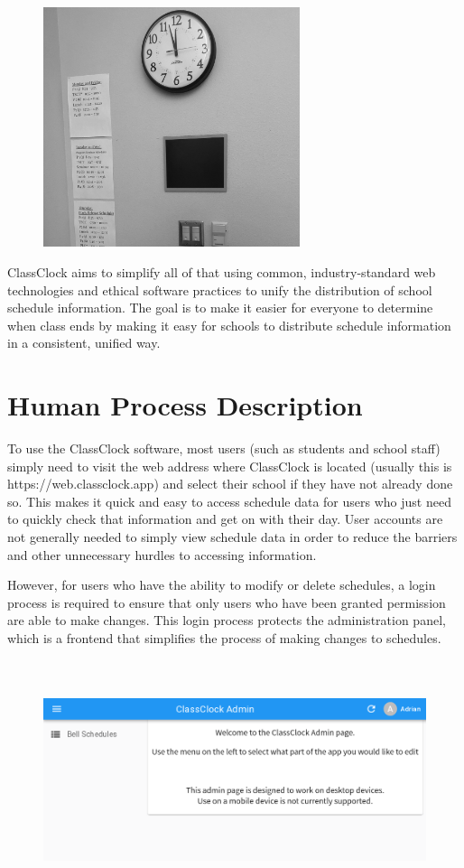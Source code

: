 \documentclass{article}
\begin{document}
\begin{figure}
\includegraphics[width=2.9547in,height=2.7646in]{Mini20Manual-img003.jpg}\end{figure}
{
ClassClock aims to simplify all of that using common, industry-standard web technologies and ethical software practices
to unify the distribution of school schedule information. The goal is to make it easier for everyone to determine when
class ends by making it easy for schools to distribute schedule information in a consistent, unified way.}

\section{Human Process Description}
{
To use the ClassClock software, most users (such as students and school staff) simply need to visit the web address
where ClassClock is located (usually this is https://web.classclock.app) and select their school if they have not
already done so. This makes it quick and easy to access schedule data for users who just need to quickly check that
information and get on with their day. User accounts are not generally needed to simply view schedule data in order to
reduce the barriers and other unnecessary hurdles to accessing information.}

{
However, for users who have the ability to modify or delete schedules, a login process is required to ensure that only
users who have been granted permission are able to make changes. This login process protects the administration panel,
which is a frontend that simplifies the process of making changes to schedules.}



\begin{figure}
\includegraphics[width=6.5in,height=2.7626in]{Mini20Manual-img004.png}\end{figure}
\end{document}
